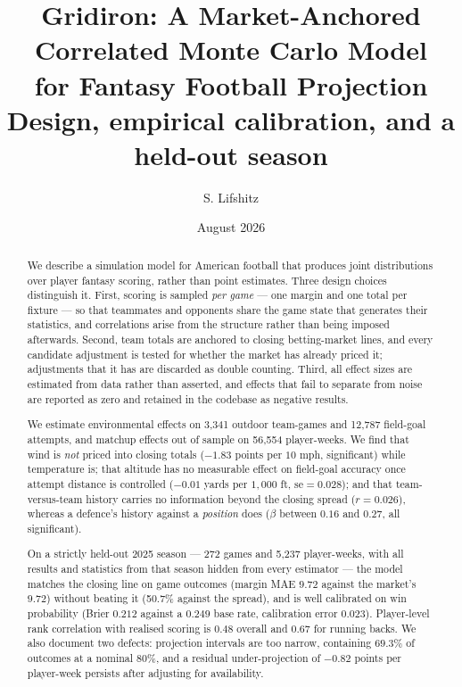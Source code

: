 \documentclass[11pt,a4paper]{article}
\title{\textbf{Gridiron: A Market-Anchored Correlated Monte Carlo Model\\
for Fantasy Football Projection}\\[0.4em]
\large Design, empirical calibration, and a held-out season}
\author{S. Lifshitz}
\date{August 2026}
\begin{document}
\maketitle

\begin{abstract}
\noindent
We describe a simulation model for American football that produces joint
distributions over player fantasy scoring, rather than point estimates. Three
design choices distinguish it. First, scoring is sampled \emph{per game} --- one
margin and one total per fixture --- so that teammates and opponents share the
game state that generates their statistics, and correlations arise from the
structure rather than being imposed afterwards. Second, team totals are anchored
to closing betting-market lines, and every candidate adjustment is tested for
whether the market has already priced it; adjustments that it has are discarded
as double counting. Third, all effect sizes are estimated from data rather than
asserted, and effects that fail to separate from noise are reported as zero and
retained in the codebase as negative results.

We estimate environmental effects on 3{,}341 outdoor team-games and 12{,}787
field-goal attempts, and matchup effects out of sample on 56{,}554 player-weeks.
We find that wind is \emph{not} priced into closing totals ($-1.83$ points per
$10$ mph, significant) while temperature is; that altitude has no measurable
effect on field-goal accuracy once attempt distance is controlled
($-0.01$ yards per $1{,}000$ ft, $\mathrm{se}=0.028$); and that team-versus-team
history carries no information beyond the closing spread ($r=0.026$), whereas a
defence's history against a \emph{position} does ($\beta$ between $0.16$ and
$0.27$, all significant).

On a strictly held-out 2025 season --- 272 games and 5{,}237 player-weeks, with
all results and statistics from that season hidden from every estimator --- the
model matches the closing line on game outcomes (margin MAE $9.72$ against the
market's $9.72$) without beating it (50.7\% against the spread), and is well
calibrated on win probability (Brier $0.212$ against a $0.249$ base rate,
calibration error $0.023$). Player-level rank correlation with realised scoring
is $0.48$ overall and $0.67$ for running backs. We also document two defects:
projection intervals are too narrow, containing $69.3\%$ of outcomes at a nominal
$80\%$, and a residual under-projection of $-0.82$ points per player-week persists
after adjusting for availability.
\end{abstract}
\end{document}
